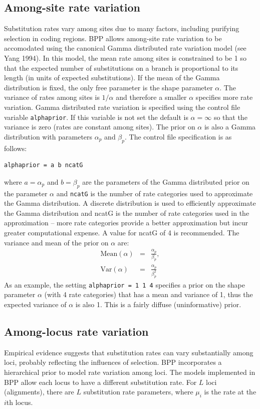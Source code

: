 \documentclass[a4paper]{book}
\numberwithin{equation}{section} \renewcommand{\baselinestretch}{0.55}
\begin{document}
\subsection{Among-site rate variation}
Substitution rates vary among sites due to many factors, including
purifying selection in coding regions.  BPP allows among-site rate
variation to be accomodated using the canonical Gamma distributed rate
variation model (see Yang 1994). In this model, the mean rate among
sites is constrained to be 1 so that the expected number of
substitutions on a branch is proportional to its length (in units of
expected substitutions). If the mean of the Gamma distribution is
fixed, the only free parameter is the shape parameter $\alpha$. The
variance of rates among sites is $1/\alpha$ and therefore a smaller
$\alpha$ specifies more rate variation.  Gamma distributed rate
variation is specified using the control file variable
\texttt{alphaprior}. If this variable is not set the default is
$\alpha = \infty$ so that the variance is zero (rates are constant
among sites).  The prior on $\alpha$ is also a Gamma distribution with
parameters $\alpha_p$ and $\beta_p$.  The control file specification
is as follows:
\begin{verbatim}
alphaprior = a b ncatG
\end{verbatim}
where $a = \alpha_p$ and $b = \beta_p$ are the parameters of the Gamma
distributed prior on the parameter $\alpha$ and \texttt{ncatG} is the
number of rate categories used to approximate the Gamma distribution.
A discrete distribution is used to efficiently approximate the Gamma
distribution and ncatG is the number of rate categories used in the
approximation -- more rate categories provide a better approximation
but incur greater computational expense. A value for ncatG of 4 is
recommended.  The variance and mean of the prior on $\alpha$ are:
\begin{eqnarray}
  \textrm{Mean}(\alpha) & = & \frac{\alpha_p}{\beta_p}, \nonumber \\
  \textrm{Var}(\alpha) & = & \frac{\alpha_p}{\beta_p^2} \nonumber
\end{eqnarray}
As an example, the setting \texttt{alphaprior = 1 1 4} specifies a
prior on the shape parameter $\alpha$ (with 4 rate categories) that
has a mean and variance of 1, thus the expected variance of $\alpha$
is also 1. This is a fairly diffuse (uninformative) prior.

\subsection{Among-locus rate variation}
Empirical evidence suggests that substitution rates can vary
substantially among loci, probably reflecting the influences of
selection. BPP incorporates a hierarchical prior to model rate
variation among loci.  The models implemented in BPP allow each locus
to have a different substitution rate.  For $L$ loci (alignments),
there are $L$ substitution rate parameters, where $\mu_i$ is the rate
at the $i$th locus.
\end{document}
